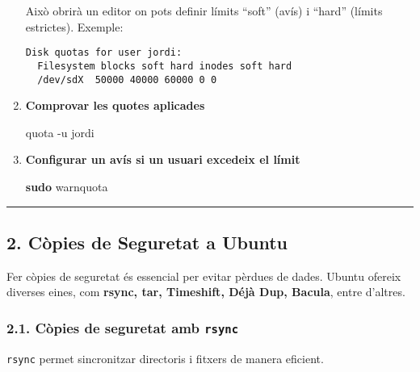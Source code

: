 \documentclass[
  12 pt,
  a4paper,
]{article}
\newenvironment{Shaded}{\begin{snugshade}}{\end{snugshade}}
\newcommand{\AttributeTok}[1]{\textcolor[rgb]{0.13,0.29,0.53}{#1}}
\newcommand{\ExtensionTok}[1]{#1}
\newcommand{\FunctionTok}[1]{\textcolor[rgb]{0.13,0.29,0.53}{\textbf{#1}}}
\newcommand{\NormalTok}[1]{#1}
\begin{document}
\begin{enumerate}
  Això obrirà un editor on pots definir límits ``soft'' (avís) i
  ``hard'' (límits estrictes). Exemple:

\begin{verbatim}
Disk quotas for user jordi:
  Filesystem blocks soft hard inodes soft hard
  /dev/sdX  50000 40000 60000 0 0
\end{verbatim}
\item
  \textbf{Comprovar les quotes aplicades}

\begin{Shaded}
\begin{Highlighting}[]
\ExtensionTok{quota} \AttributeTok{{-}u}\NormalTok{ jordi}
\end{Highlighting}
\end{Shaded}
\item
  \textbf{Configurar un avís si un usuari excedeix el límit}

\begin{Shaded}
\begin{Highlighting}[]
\FunctionTok{sudo}\NormalTok{ warnquota}
\end{Highlighting}
\end{Shaded}
\end{enumerate}

\begin{center}\rule{0.5\linewidth}{0.5pt}\end{center}

\subsection{2. Còpies de Seguretat a
Ubuntu}\label{cuxf2pies-de-seguretat-a-ubuntu}

Fer còpies de seguretat és essencial per evitar pèrdues de dades. Ubuntu
ofereix diverses eines, com \textbf{rsync, tar, Timeshift, Déjà Dup,
Bacula}, entre d'altres.

\subsubsection{\texorpdfstring{2.1. Còpies de seguretat amb
\texttt{rsync}}{2.1. Còpies de seguretat amb rsync}}\label{cuxf2pies-de-seguretat-amb-rsync}

\texttt{rsync} permet sincronitzar directoris i fitxers de manera
eficient.
\end{document}
